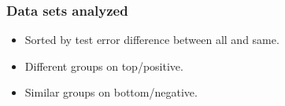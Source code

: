 \documentclass{beamer}
\begin{document}
\begin{frame}
  \frametitle{Data sets analyzed}
  \begin{itemize}
  \item Sorted by test error difference between all and same.
  \item Different groups on top/positive.
  \item Similar groups on bottom/negative.
  \end{itemize}
  \scriptsize


\end{frame}
\end{document}
